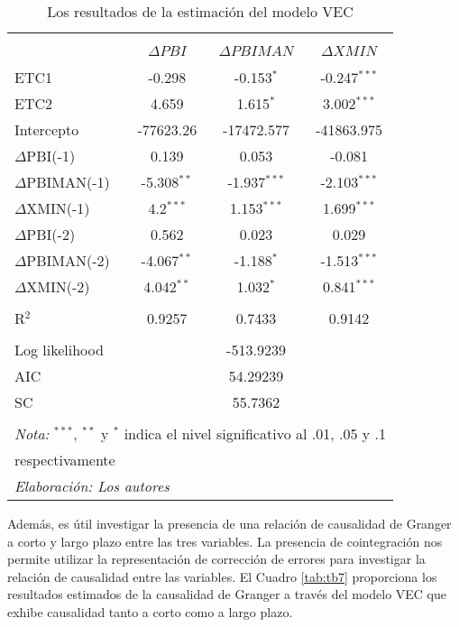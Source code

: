 \documentclass[11pt,]{article}
\begin{document}
\begin{table}[!htbp] \centering 
  \caption{Los resultados de la estimación del modelo VEC} 
  \label{tab:tb6} 
\small 
\begin{tabular}{@{\extracolsep{5pt}} lccc} 
\\[-1.8ex]\hline 
\hline \\[-1.8ex] 
\\[-1.8ex] & $\Delta PBI$  &  $\Delta PBIMAN$ & $\Delta XMIN$\\
\hline \\[-1.8ex] 
ETC1 & -0.298 & -0.153$^{*}$ & -0.247$^{***}$ \\ 
ETC2 & 4.659 & 1.615$^{*}$ & 3.002$^{***}$ \\ 
Intercepto & -77623.26 & -17472.577 & -41863.975 \\ 
 $\Delta$PBI(-1) & 0.139 & 0.053 & -0.081 \\ 
$\Delta$PBIMAN(-1) & -5.308$^{**}$ & -1.937$^{***}$ & -2.103$^{***}$ \\ 
$\Delta$XMIN(-1) & 4.2$^{***}$ & 1.153$^{***}$ & 1.699$^{***}$ \\ 
$\Delta$PBI(-2) & 0.562 & 0.023 & 0.029 \\ 
$\Delta$PBIMAN(-2) & -4.067$^{**}$ & -1.188$^{*}$ & -1.513$^{***}$ \\ 
$\Delta$XMIN(-2) & 4.042$^{**}$ & 1.032$^{*}$ & 0.841$^{***}$ \\ 
\hline \\[-1.8ex] 
R$^{2}$ & 0.9257 & 0.7433 & 0.9142 \\ 
\hline \\[-1.8ex] 
Log likelihood &  & -513.9239 &  \\ 
AIC &  & 54.29239 &  \\ 
SC &  & 55.7362 &  \\ 
\hline \\[-1.8ex] 
\multicolumn{4}{l}{\footnotesize{\textit{Nota:} $^{***}$, $^{**}$ y $^{*}$ indica el nivel significativo al .01, .05 y .1}} \\ 
\multicolumn{4}{l}{\footnotesize{respectivamente}} \\ 
\multicolumn{4}{l}{\footnotesize{\textit{Elaboración: Los autores}}} \\ 
\end{tabular} 
\end{table}

Además, es útil investigar la presencia de una relación de causalidad de
Granger a corto y largo plazo entre las tres variables. La presencia de
cointegración nos permite utilizar la representación de corrección de
errores para investigar la relación de causalidad entre las variables.
El Cuadro \ref{tab:tb7} proporciona los resultados estimados de la
causalidad de Granger a través del modelo VEC que exhibe causalidad
tanto a corto como a largo plazo.
\end{document}

